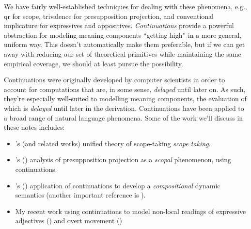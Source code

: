 \documentclass[nols,nofonts,nobib,nohyper]{tufte-book}
\begin{document}
    We have fairly well-established techniques for dealing with these
    phenomena, e.g., \ac{qr} for scope, trivalence for presupposition
    projection, and conventional implicature
    for expressives and
    appositives.
    \textit{Continuations} provide a powerful abstraction for modeling meaning
    components \enquote{getting high} in a more general, uniform way. This
    doesn't automatically make them preferable, but if we can get away with
    reducing our set of theoretical primitives while maintaining the same
    empirical coverage, we should at least pursue the possibility.

    Continuations were originally developed by computer scientists in order to account for
    computations that are, in some sense, \textit{delayed} until later on. As
    such, they're especially well-suited to modelling meaning components, the
    evaluation of which is \textit{delayed} until later in the derivation.
    Continuations have been applied to a broad range of natural language
    phenomena. Some of the work we'll discuss in these notes includes:

    \begin{itemize}

    \item \citeauthor{barkerShan2015}'s (and related works) unified theory of scope-taking \textit{scope taking}.

    \item \citeauthor{grove2019}'s (\citeyear{grove2019}) analysis of presupposition projection as a
        \textit{scopal} phenomenon, using continuations.

      \item \citeauthor{deGroote2006}'s (\citeyear{deGroote2006}) application of
        continuations to develop a \textit{compositional} dynamic semantics (another important reference is \citealt{Charlowc}).

     \item My recent work using continuations to model non-local readings
        of expressive adjectives (\citealt{elliott-fuck}) and overt movement (\citealt{elliott2019movement})

    \end{itemize}
\end{document}
